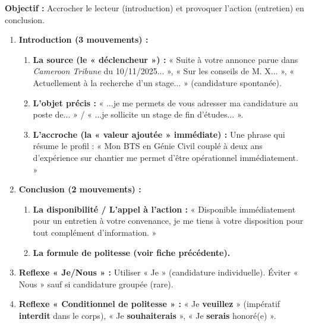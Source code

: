 \documentclass[11pt]{article}
\begin{document}
\begin{methode}
    \textbf{Objectif :} Accrocher le lecteur (introduction) et provoquer l'action (entretien) en conclusion.
    \begin{enumerate}
        \item \textbf{Introduction (3 mouvements) :}
            \begin{enumerate}
                \item \textbf{La source (le « déclencheur ») :} « Suite à votre annonce parue dans \emph{Cameroon Tribune} du 10/11/2025... », « Sur les conseils de M. X... », « Actuellement à la recherche d'un stage... » (candidature spontanée).
                \item \textbf{L'objet précis :} « ...je me permets de vous adresser ma candidature au poste de... » / « ...je sollicite un stage de fin d'études... ».
                \item \textbf{L'accroche (la « valeur ajoutée » immédiate) :} Une phrase qui résume le profil : « Mon BTS en Génie Civil couplé à deux ans d'expérience sur chantier me permet d'être opérationnel immédiatement. »
            \end{enumerate}
        \item \textbf{Conclusion (2 mouvements) :}
            \begin{enumerate}
                \item \textbf{La disponibilité / L'appel à l'action :} « Disponible immédiatement pour un entretien à votre convenance, je me tiens à votre disposition pour tout complément d'information. »
                \item \textbf{La formule de politesse (voir fiche précédente).}
            \end{enumerate}
        \item \textbf{Reflexe « Je/Nous » :} Utiliser « Je » (candidature individuelle). Éviter « Nous » sauf si candidature groupée (rare).
        \item \textbf{Reflexe « Conditionnel de politesse » :} « Je \textbf{veuillez} » (impératif \textbf{interdit} dans le corps), « Je \textbf{souhaiterais} », « Je \textbf{serais} honoré(e) ».
    \end{enumerate}
\end{methode}
\end{document}
